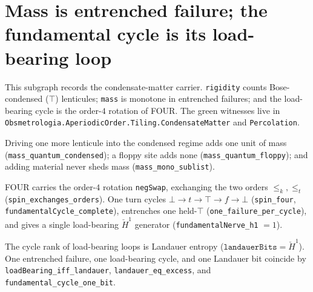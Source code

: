 \section{Mass is entrenched failure; the fundamental cycle is its load-bearing loop}

This subgraph records the condensate-matter carrier.  \texttt{rigidity} counts
Bose-condensed ($\top$) lenticules; \texttt{mass} is monotone in entrenched
failures; and the load-bearing cycle is the order-$4$ rotation of FOUR.  The
green witnesses live in
\texttt{Obsmetrologia.AperiodicOrder.Tiling.CondensateMatter} and \texttt{Percolation}.

\begin{theorem}\label{thm:mass-quantum}\leanok{}
Driving one more lenticule into the condensed regime adds one unit of mass
(\texttt{mass\_quantum\_condensed}); a floppy site adds none
(\texttt{mass\_quantum\_floppy}); and adding material never sheds mass
(\texttt{mass\_mono\_sublist}).
\end{theorem}

\begin{theorem}\label{thm:fundamental-cycle-local-h1}\leanok{}
FOUR carries the order-$4$ rotation \texttt{negSwap}, exchanging the two orders
$\le_k,\le_t$ (\texttt{spin\_exchanges\_orders}).  One turn cycles
$\bot \to t \to \top \to f \to \bot$
(\texttt{spin\_four}, \texttt{fundamentalCycle\_complete}), entrenches one
held-$\top$ (\texttt{one\_failure\_per\_cycle}), and gives a single
load-bearing $\check H^1$ generator (\texttt{fundamentalNerve\_h1} $=1$).
\end{theorem}

\begin{theorem}\label{thm:mass-is-landauer}\leanok{}
The cycle rank of load-bearing loops is Landauer entropy
($\texttt{landauerBits}=\check H^1$).  One entrenched failure, one load-bearing
cycle, and one Landauer bit coincide by
\texttt{loadBearing\_iff\_landauer}, \texttt{landauer\_eq\_excess}, and
\texttt{fundamental\_cycle\_one\_bit}.
\end{theorem}

